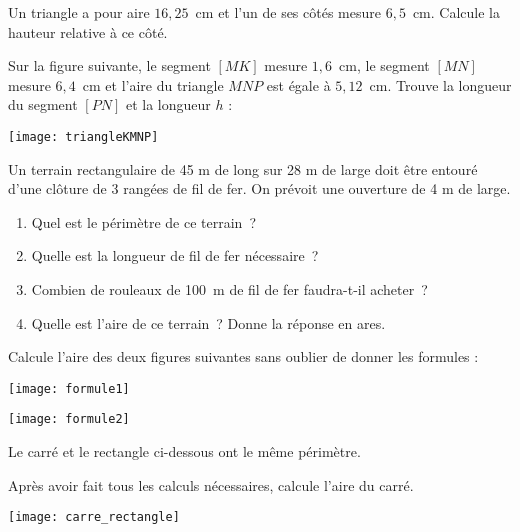 \begin{exercice}
Un triangle a pour aire $16,25$ cm et l'un de ses côtés mesure $6,5$ cm. Calcule la hauteur relative à ce côté.
\end{exercice}


\begin{exercice}
Sur la figure suivante, le segment $[MK]$ mesure $1,6$ cm, le segment $[MN]$ mesure $6,4$ cm et l'aire du triangle $MNP$ est égale à $5,12$ cm. Trouve la longueur du segment $[PN]$ et la longueur $h$ :
\begin{center} \texttt{[image: triangleKMNP]} \end{center} 
\end{exercice}





\newpage



\begin{exercice}
Un terrain rectangulaire de 45 m de long sur 28 m de large doit être entouré d’une clôture de 3 rangées de fil de fer. On prévoit une ouverture de 4 m de large.
\begin{enumerate}
 \item Quel est le périmètre de ce terrain ?
 \item Quelle est la longueur de fil de fer nécessaire ?
 \item Combien de rouleaux de 100 m de fil de fer faudra-t-il acheter ?
 \item Quelle est l’aire de ce terrain ? Donne la réponse en ares.
 \end{enumerate}
\end{exercice}




\begin{exercice}
Calcule l'aire des deux figures suivantes sans oublier de donner les formules :
\begin{center} \texttt{[image: formule1]} \end{center} 
\begin{center} \texttt{[image: formule2]} \end{center} 
\end{exercice}


\begin{exercice}
Le carré et le rectangle ci-dessous ont le même périmètre.
     
Après avoir fait tous les calculs nécessaires, calcule l’aire du carré.
\begin{center} \texttt{[image: carre\_rectangle]} \end{center} 
\end{exercice}




